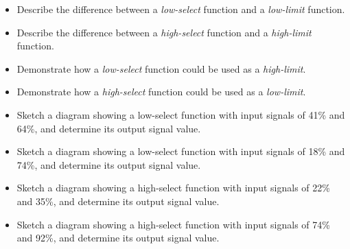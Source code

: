 \begin{itemize}
\item{} Describe the difference between a {\it low-select} function and a {\it low-limit} function.
\item{} Describe the difference between a {\it high-select} function and a {\it high-limit} function.
\item{} Demonstrate how a {\it low-select} function could be used as a {\it high-limit}.
\item{} Demonstrate how a {\it high-select} function could be used as a {\it low-limit}.
\item{} Sketch a diagram showing a low-select function with input signals of 41\% and 64\%, and determine its output signal value.
\item{} Sketch a diagram showing a low-select function with input signals of 18\% and 74\%, and determine its output signal value.
\item{} Sketch a diagram showing a high-select function with input signals of 22\% and 35\%, and determine its output signal value.
\item{} Sketch a diagram showing a high-select function with input signals of 74\% and 92\%, and determine its output signal value.
\end{itemize}




